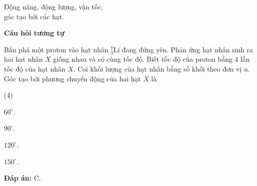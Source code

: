 \begin{dang}{Động năng, động lượng, vận tốc,\\ góc tạo bởi các hạt.}
{\begin{center}
	\textbf{Câu hỏi tương tự}
\end{center}
Bắn phá một proton vào hạt nhân $ ^{7}_{3} \text{Li} $ đang đứng yên. Phản ứng hạt nhân sinh ra hai hạt nhân $ X $ giống nhau và có cùng tốc độ. Biết tốc độ của proton bằng $ 4 $ lần tốc độ của hạt nhân $ X $. Coi khối lượng của hạt nhân bằng số khối theo đơn vị $ u $. Góc tạo bởi phương chuyển động của hai hạt $ X $ là 
\begin{mcq}(4)
	\item $ 60^\circ $.	
	\item $ 90^\circ $.	
	\item $ 120^\circ $.	
	\item $ 150^\circ $.		
\end{mcq}

		\textbf{Đáp án:} C.
		}

	\end{dang}

